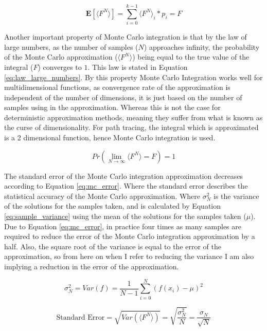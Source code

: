 \documentclass[../dissertation.tex]{subfiles}
\begin{document}
\begin{equation}
\label{eq:unbiased}
\mathbf{E}[\langle F^N \rangle] = \sum_{i = 0}^{k-1} \langle F^N \rangle_i * p_i =  F
\end{equation}

Another important property of Monte Carlo integration is that by the law of large numbers, as the number of samples ($N$) approaches infinity, the probability of the Monte Carlo approximation ($\langle F^N \rangle$) being equal to the true value of the integral ($F$) converges to $1$. This law is stated in Equation \ref{eq:law_large_numbers}. By this property Monte Carlo Integration works well for multidimensional functions, as convergence rate of the approximation is independent of the number of dimensions, it is just based on the number of samples using in the approximation. Whereas this is not the case for deterministic approximation methods, meaning they  suffer from what is known as the curse of dimensionality. For path tracing, the integral which is approximated is a 2 dimensional function, hence Monte Carlo integration is used. 

\begin{equation}
\label{eq:law_large_numbers}
Pr( \lim_{N \rightarrow \infty} \langle F^N \rangle = F ) = 1
\end{equation}

The standard error of the Monte Carlo integration approximation decreases according to Equation \ref{eq:mc_error}. Where the standard error describes the statistical accuracy of the Monte Carlo approximation. Where $\sigma_N^2$ is the variance of the solutions for the samples  taken, and is calculated by Equation \ref{eq:sample_variance} using the mean of the solutions for the samples taken ($\mu$). Due to Equation \ref{eq:mc_error}, in practice four times as many samples are required to reduce the error of the Monte Carlo integration approximation by a half. Also, the square root of the variance  is equal to the error of the approximation, so from here on when I refer to reducing the variance I am also implying a reduction in the error of the approximation.

\begin{equation}
\label{eq:sample_variance}
\sigma_N^2 = Var(f) = \frac{1}{N-1} \sum_{i=0}^N (f(x_i) - \mu)^2
\end{equation}

\begin{equation}
\label{eq:mc_error}
\text{Standard Error} = \sqrt{Var(\langle F^N \rangle)} = \sqrt{\frac{\sigma_N^2}{N}} = \frac{\sigma_N}{\sqrt{N}}
\end{equation}
\end{document}
